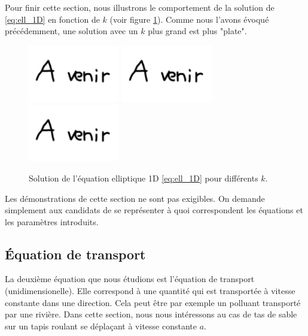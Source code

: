 \documentclass[12pt,a4paper,twoside]{article}
\begin{document}
Pour finir cette section, nous illustrons le comportement
de la solution de \eqref{eq:ell_1D} en fonction de $k$
(voir figure \ref{fig:ell_k}).
Comme nous l'avons \'evoqu\'e pr\'ec\'edemment, une solution avec 
un $k$ plus grand est plus "plate".


\begin{figure}[h]
  \centering
  \includegraphics[width = 4cm]{Figures/A_venir.png}
  \includegraphics[width = 4cm]{Figures/A_venir.png}
  \includegraphics[width = 4cm]{Figures/A_venir.png}
  \caption{Solution de l'\'equation elliptique 1D \eqref{eq:ell_1D}
  pour diff\'erents $k$.}
  \label{fig:ell_k}
\end{figure}


\begin{remark}
  Les d\'emonstrations de cette section ne sont pas exigibles.
  On demande simplement aux candidats de se repr\'esenter \`a quoi
  correspondent les \'equations et les param\`etres introduits.
\end{remark}

\subsection{\'Equation de transport}

La deuxi\`eme \'equation que nous \'etudions est l'\'equation de transport
(unidimensionelle).
Elle correspond \`a une quantit\'e qui est transport\'ee \`a vitesse
constante dans une direction.
Cela peut \^etre par exemple un polluant transport\'e par une rivi\`ere.
Dans cette section, nous nous int\'eressons au cas de tas de sable
sur un tapis roulant se d\'epla\c{c}ant \`a vitesse constante $a$.
\end{document}
